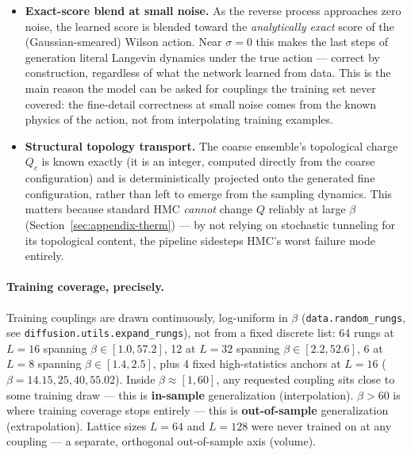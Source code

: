 \begin{itemize}
  \item \textbf{Exact-score blend at small noise.} As the reverse process
    approaches zero noise, the learned score is blended toward the
    \emph{analytically exact} score of the (Gaussian-smeared) Wilson
    action. Near $\sigma = 0$ this makes the last steps of generation
    literal Langevin dynamics under the true action --- correct by
    construction, regardless of what the network learned from data. This is
    the main reason the model can be asked for couplings the training set
    never covered: the fine-detail correctness at small noise comes from
    the known physics of the action, not from interpolating training
    examples.
  \item \textbf{Structural topology transport.} The coarse ensemble's
    topological charge $Q_c$ is known exactly (it is an integer, computed
    directly from the coarse configuration) and is deterministically
    projected onto the generated fine configuration, rather than left to
    emerge from the sampling dynamics. This matters because standard HMC
    \emph{cannot} change $Q$ reliably at large $\beta$
    (Section~\ref{sec:appendix-therm}) --- by not relying on stochastic
    tunneling for its topological content, the pipeline sidesteps HMC's
    worst failure mode entirely.
\end{itemize}

\paragraph{Training coverage, precisely.} Training couplings are drawn
continuously, log-uniform in $\beta$ (\texttt{data.random\_rungs}, see
\texttt{diffusion.utils.expand\_rungs}), not from a fixed discrete list: 64
rungs at $L=16$ spanning $\beta \in [1.0, 57.2]$, 12 at $L=32$ spanning
$\beta \in [2.2, 52.6]$, 6 at $L=8$ spanning $\beta \in [1.4, 2.5]$, plus 4
fixed high-statistics anchors at $L=16$ ($\beta = 14.15, 25, 40, 55.02$).
Inside $\beta \approx [1, 60]$, any requested coupling sits close to some
training draw --- this is \textbf{in-sample} generalization (interpolation).
$\beta > 60$ is where training coverage stops entirely --- this is
\textbf{out-of-sample} generalization (extrapolation). Lattice sizes $L=64$
and $L=128$ were never trained on at any coupling --- a separate, orthogonal
out-of-sample axis (volume).

